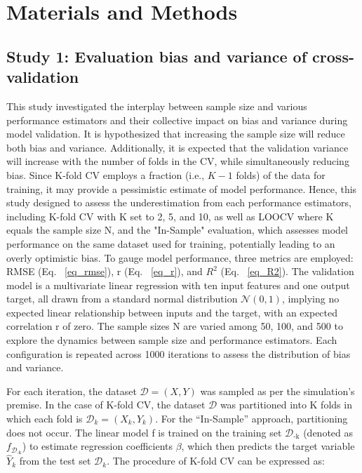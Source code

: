 \section{Materials and Methods}

\subsection{Study 1: Evaluation bias and variance of cross-validation}

This study investigated the interplay between sample size and various performance estimators and their collective impact on bias and variance during model validation. It is hypothesized that increasing the sample size will reduce both bias and variance. Additionally, it is expected that the validation variance will increase with the number of folds in the CV, while simultaneously reducing bias. Since K-fold CV employs a fraction (i.e., $K-1$ folds) of the data for training, it may provide a pessimistic estimate of model performance. Hence, this study designed to assess the underestimation from each performance estimators, including K-fold CV with K set to 2, 5, and 10, as well as LOOCV where K equals the sample size N, and the "In-Sample" evaluation, which assesses model performance on the same dataset used for training, potentially leading to an overly optimistic bias. To gauge model performance, three metrics are employed: RMSE (Eq. ~\ref{eq_rmse}), r (Eq. ~\ref{eq_r}), and $R^2$ (Eq. ~\ref{eq_R2}). The validation model is a multivariate linear regression with ten input features and one output target, all drawn from a standard normal distribution $\mathcal{N}(0, 1)$, implying no expected linear relationship between inputs and the target, with an expected correlation r of zero. The sample sizes N are varied among 50, 100, and 500 to explore the dynamics between sample size and performance estimators. Each configuration is repeated across 1000 iterations to assess the distribution of bias and variance.

For each iteration, the dataset $\mathcal{D}={(X, Y)}$ was sampled as per the simulation’s premise. In the case of K-fold CV, the dataset $\mathcal{D}$ was partitioned into K folds in which each fold is $\mathcal{D}_k={(X_k, Y_k)}$. For the “In-Sample” approach, partitioning does not occur. The linear model f is trained on the training set $\mathcal{D}_\text{-k}$ (denoted as $f_{\mathcal{D}_{\text{-k}}}$) to estimate regression coefficients $\beta$, which then predicts the target variable ${\hat{Y}}_k$ from the test set $\mathcal{D}_k$. The procedure of K-fold CV can be expressed as:


